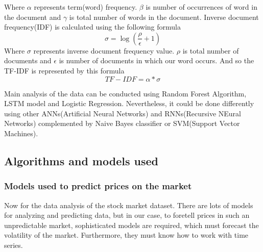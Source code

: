 \documentclass[10pt,twoside,english,a4paper]{article}
\begin{document}
Where $\alpha$ represents term(word) frequency. $\beta$ is number of occurrences of word in the document and $\gamma$ is total number of words in the document.
\newline
Inverse document frequency(IDF) is calculated using the following formula
\[ \sigma = \log (\frac{\rho}{\epsilon} + 1)\]
Where $\sigma$ represents inverse document frequency value. $\rho$ is total number of documents and $\epsilon$ is number of documents in which our word occurs. 
\newline 
And so the TF-IDF is represented by this formula
\[ TF-IDF = \alpha*\sigma\]
\par Main analysis of the data can be conducted using Random Forest Algorithm, LSTM model and Logistic Regression. Nevertheless, it could be done differently using other ANNs(Artificial Neural Networks) and RNNs(Recursive NEural Networks) complemented by Naive Bayes classifier or SVM(Support Vector Machines).

\subsection{Algorithms and models used}
\subsubsection {Models used to predict prices on the market} 

Now for the data analysis of the stock market dataset. There are lots of models for analyzing and predicting data, but in our case, to foretell prices in such an unpredictable market, sophisticated models are required, which must forecast the volatility of the market. Furthermore, they must know how to work with time series.
\end{document}
